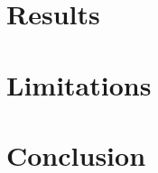 \documentclass[sigconf]{acmart}
\begin{document}
\section{Results}




\section{Limitations}




\section{Conclusion}






\end{document}
